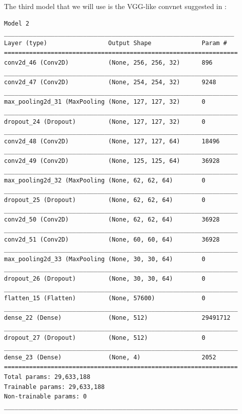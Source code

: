 \documentclass[10pt,a4paper]{article}
\begin{document}
\newpage
\noindent
The third model that we will use is the VGG-like convnet suggested in \cite{KerasDocs}:
\begin{lstlisting}
Model 2
________________________________________________________________
Layer (type)                 Output Shape              Param #   
=================================================================
conv2d_46 (Conv2D)           (None, 256, 256, 32)      896       
_________________________________________________________________
conv2d_47 (Conv2D)           (None, 254, 254, 32)      9248      
_________________________________________________________________
max_pooling2d_31 (MaxPooling (None, 127, 127, 32)      0         
_________________________________________________________________
dropout_24 (Dropout)         (None, 127, 127, 32)      0         
_________________________________________________________________
conv2d_48 (Conv2D)           (None, 127, 127, 64)      18496     
_________________________________________________________________
conv2d_49 (Conv2D)           (None, 125, 125, 64)      36928     
_________________________________________________________________
max_pooling2d_32 (MaxPooling (None, 62, 62, 64)        0         
_________________________________________________________________
dropout_25 (Dropout)         (None, 62, 62, 64)        0         
_________________________________________________________________
conv2d_50 (Conv2D)           (None, 62, 62, 64)        36928     
_________________________________________________________________
conv2d_51 (Conv2D)           (None, 60, 60, 64)        36928     
_________________________________________________________________
max_pooling2d_33 (MaxPooling (None, 30, 30, 64)        0         
_________________________________________________________________
dropout_26 (Dropout)         (None, 30, 30, 64)        0         
_________________________________________________________________
flatten_15 (Flatten)         (None, 57600)             0         
_________________________________________________________________
dense_22 (Dense)             (None, 512)               29491712  
_________________________________________________________________
dropout_27 (Dropout)         (None, 512)               0         
_________________________________________________________________
dense_23 (Dense)             (None, 4)                 2052      
=================================================================
Total params: 29,633,188
Trainable params: 29,633,188
Non-trainable params: 0
_________________________________________________________________
\end{lstlisting}
\end{document}
